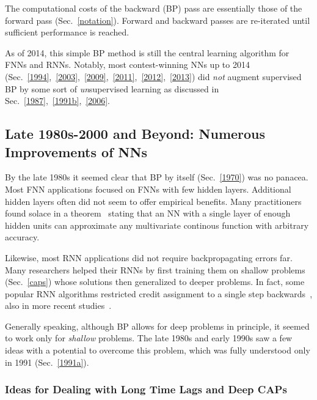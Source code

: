 \documentclass[letterpaper]{article}
\begin{document}
\begin{sloppypar}
The computational costs of the backward (BP) pass are essentially those of the forward pass
(Sec.~\ref{notation}).
Forward and backward passes are re-iterated until sufficient performance is reached.

As of 2014, this simple BP method is still the central learning algorithm for FNNs and RNNs.
Notably,
most contest-winning NNs up to 2014 (Sec.~\ref{1994},~\ref{2003},~\ref{2009},~\ref{2011},~\ref{2012},~\ref{2013})
did {\em not} augment supervised BP by 
some sort of {\em un}supervised learning as discussed in Sec.~\ref{1987},~\ref{1991b},~\ref{2006}.

\subsection{Late 1980s-2000 and Beyond: Numerous Improvements of NNs}
\label{1990}


By the late 1980s it seemed clear that BP by itself (Sec.~\ref{1970}) was no panacea.
Most FNN applications focused on FNNs with few hidden layers.
Additional hidden layers often did not seem to offer empirical benefits.
Many practitioners found solace in a theorem~\citep{Kolmogorov:57,hecht1989,hornik1989}
stating that an NN with a single layer of enough hidden units 
can approximate any multivariate continous function
with arbitrary accuracy.



Likewise, most RNN applications 
did not require backpropagating errors far. 
Many researchers helped their RNNs by first 
training them on shallow problems (Sec.~\ref{caps})
whose solutions then generalized to deeper problems.  
In fact, some popular RNN algorithms restricted credit 
assignment to a single step backwards~\citep{elman1990,Jordan:86,jordan1997},
also in more recent studies~\citep{Jaeger2001a,maass2002,Jaeger:04}. 

Generally speaking, although BP allows for deep problems in principle,
it seemed to work only for {\em shallow} problems.  
The late 1980s and early 1990s saw a few ideas 
with a potential to overcome this problem,
which was fully understood only in 1991 (Sec.~\ref{1991a}).




\subsubsection{Ideas for Dealing with Long Time Lags and Deep CAPs}
\label{timelags}


\end{sloppypar}
\end{document}
